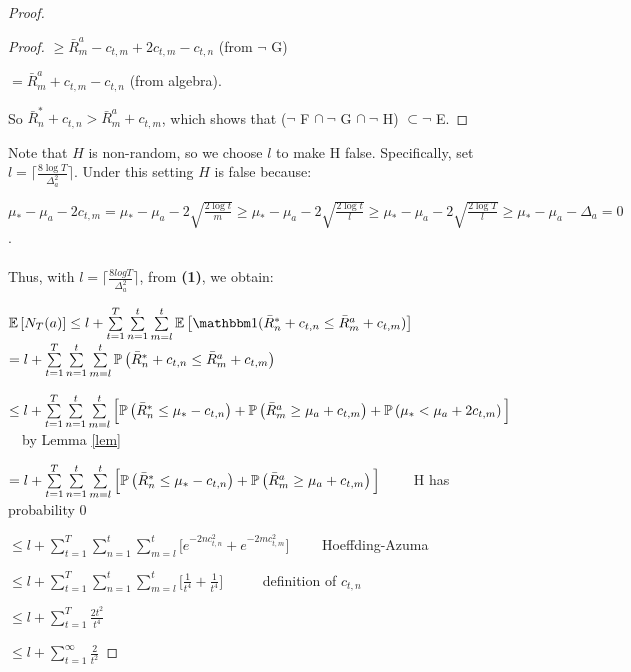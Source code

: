 \documentclass[11pt]{article}
\begin{document}
\begin{proof}
\begin{proof}
$ \geq   \bar R^a_{m} - c_{t,m} + 2c_{t,m} - c_{t,n} $	(from $\neg $ G)

$ =  \bar R^a_{m} + c_{t,m} - c_{t,n} $ (from algebra).

So $\bar R^*_{n} + c_{t,n} > \bar R^a_{m} + c_{t,m}$, which shows that ($\neg $ F $\cap \  \neg$ G $\cap \  \neg$ H) $ \subset \neg $ E. \end{proof}

Note that $H$ is non-random, so we choose $l$ to make H false. Specifically, set $l = \Big \lceil \frac{8 \log T}{\Delta_a^2} \Big \rceil $.  Under this setting $H$ is false because:

$\mu_* - \mu_a - 2c_{t,m} = \mu_* - \mu_a - 2 \sqrt{\frac{2\log t}{m}} \geq  \mu_* - \mu_a - 2 \sqrt{\frac{2\log t}{l}} \geq  \mu_* - \mu_a - 2 \sqrt{\frac{2\log T}{l}}  \geq \mu_* - \mu_a - \Delta_a = 0 $.\\
\\

Thus, with $l = \Big \lceil \frac{8logT}{\Delta_a^2} \Big \rceil$, from {\bf(1)}, we obtain:

$\E{N_T(a) }  \leq l +  \sum\limits^T_{t = 1}  \sum\limits^{t}_{n = 1}  \sum\limits^{t}_{m = l} \E{\ind (\bar R^*_{n} + c_{t,n} \leq \bar R^a_{m} + c_{t,m}  )}$
$= l +  \sum\limits^T_{t = 1}  \sum\limits^{t}_{n = 1}  \sum\limits^{t}_{m = l} \mathbb{P}\left( \bar R^*_{n} + c_{t,n} \leq \bar R^a_{m} + c_{t,m}   \right)$

$\leq  l +  \sum\limits^T_{t = 1}  \sum\limits^{t}_{n = 1}  \sum\limits^{t}_{m = l} \Big[ \mathbb{P}\left( \bar R^*_{n} \leq \mu_* - c_{t,n}  \right) + \mathbb{P}\left( \bar R^a_{m} \geq \mu_a + c_{t,m}  \right)  + \mathbb{P}\left(  \mu_* < \mu_a + 2c_{t,m}   \right)\Big] $ \ \ {\small by Lemma \ref{lem}}

$=  l +  \sum\limits^T_{t = 1}  \sum\limits^{t}_{n = 1}  \sum\limits^{t}_{m = l} \Big[ \mathbb{P}\left( \bar R^*_{n} \leq \mu_* - c_{t,n}  \right) + \mathbb{P}\left( \bar R^a_{m} \geq \mu_a + c_{t,m}  \right)  \Big] $ \ \ \ \ {H has probability 0}

$\leq  l +  \sum\limits^T_{t = 1}  \sum\limits^{t}_{n = 1}  \sum\limits^{t}_{m = l} \Big[ e^{-2nc^2_{t,n}} + e^{-2mc^2_{t,m}}   \Big] $ \ \ \ \ {\small Hoeffding-Azuma}

$\leq  l +  \sum\limits^T_{t = 1}  \sum\limits^{t}_{n = 1}  \sum\limits^{t}_{m = l} \Big[ \frac{1}{t^4} + \frac{1}{t^4}   \Big] $  \ \ \ \ \ {\small definition of $c_{t,n}$}

$\leq l + \sum\limits^T_{t = 1} \frac{2t^2}{t^4}$

$\leq l + \sum\limits^\infty_{t = 1} \frac{2}{t^2}$


\end{proof}
\end{document}
